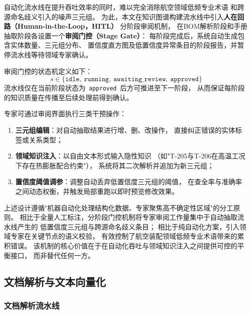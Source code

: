 自动化流水线在提升吞吐效率的同时，难以完全消除航空领域低频专业术语
和跨源命名歧义引入的噪声三元组。
为此，本文在知识图谱构建流水线中引入\textbf{人在回路（Human-in-the-Loop，HITL）}
分阶段审阅机制\cite{amershi2014power}，
在BOM解析阶段和手册抽取阶段各设置一个\textbf{审阅门控（Stage Gate）}：
每阶段完成后，系统自动生成包含实体数量、三元组分布、
置信度直方图及低置信度异常条目的阶段报告，并暂停流水线等待领域专家确认。

审阅门控的状态机定义如下：
\begin{equation}
  s \in \{\texttt{idle},\ \texttt{running},\ \texttt{awaiting\_review},\ \texttt{approved}\}
  \label{eq:hitl-state}
\end{equation}
流水线仅在当前阶段状态为~\texttt{approved}~后方可推进至下一阶段，
从而保证每阶段的知识质量在传播至后续处理前得到确认。

专家可通过审阅界面执行三类干预操作：
\begin{enumerate}
  \item \textbf{三元组编辑}：对自动抽取结果进行增、删、改操作，
        直接纠正错误的实体标签或关系类型；
  \item \textbf{领域知识注入}：以自由文本形式输入隐性知识
        （如"T-205与T-206在高温工况下存在热膨胀配合约束"），
        系统将其二次解析并追加为新三元组；
  \item \textbf{置信度阈值调参}：调整自动丢弃低置信度三元组的阈值，
        在查全率与准确率之间动态权衡，并触发局部重跑以即时预览修改效果。
\end{enumerate}

上述设计遵循"机器自动化处理结构化数据、专家聚焦高不确定性区域"的分工原则。
相比于全量人工标注，分阶段门控机制将专家审阅工作量集中于自动抽取流水线产生的
低置信度三元组与跨源命名歧义条目；
相比于纯自动化方案，引入领域专家在关键节点的语义校验，
有效控制了航空装配领域低频专业术语带来的累积错误。
该机制的核心价值在于在自动化吞吐与领域知识注入之间提供可控的平衡接口，
而非替代任何一方。

\subsection{文档解析与文本向量化}
\label{sec:index}

\subsubsection{文档解析流水线}
\label{sec:parse}

